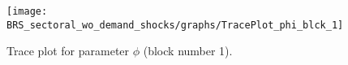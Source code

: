 \begin{figure}[H]
\centering
  \texttt{[image: BRS\_sectoral\_wo\_demand\_shocks/graphs/TracePlot\_phi\_blck\_1]}\\
    \caption{Trace plot for parameter ${\phi}$ (block number 1).}
\end{figure}
